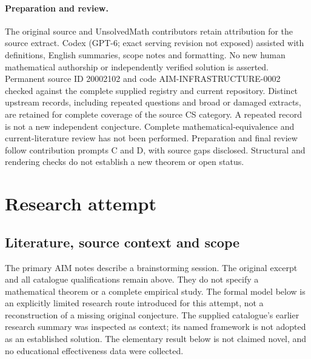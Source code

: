 \documentclass[11pt]{article}
\begin{document}
\paragraph{Preparation and review.}
The original source and UnsolvedMath contributors retain attribution for the source extract. Codex (GPT-6; exact serving revision not exposed) assisted with definitions, English summaries, scope notes and formatting. No new human mathematical authorship or independently verified solution is asserted. Permanent source ID 20002102 and code AIM-INFRASTRUCTURE-0002 checked against the complete supplied registry and current repository. Distinct upstream records, including repeated questions and broad or damaged extracts, are retained for complete coverage of the source CS category. A repeated record is not a new independent conjecture. Complete mathematical-equivalence and current-literature review has not been performed. Preparation and final review follow contribution prompts C and D, with source gaps disclosed. Structural and rendering checks do not establish a new theorem or open status.
\label{end:20002102}

\section{Research attempt}
\subsection{Literature, source context and scope}
The primary AIM notes describe a brainstorming session. The original excerpt and all catalogue qualifications remain above. They do not specify a mathematical theorem or a complete empirical study. The formal model below is an explicitly limited research route introduced for this attempt, not a reconstruction of a missing original conjecture. The supplied catalogue's earlier research summary was inspected as context; its named framework is not adopted as an established solution. The elementary result below is not claimed novel, and no educational effectiveness data were collected.
\end{document}
